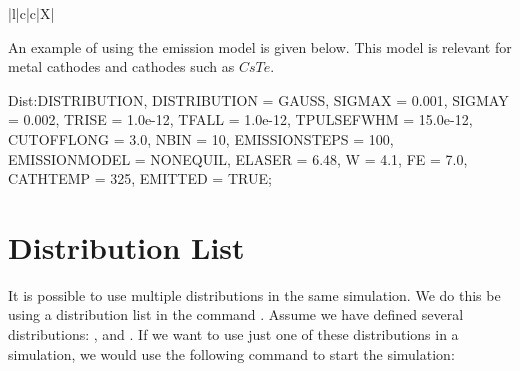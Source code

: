 \begin{table}[!htb]
  \begin{center}\footnotesize
    \caption{Attributes for the  and  emission models.}
    \label{tab:distattremitmodelnonequil}
    \begin{tabularx}{\textwidth-1cm}{|l|c|c|X|}
      \hline
      \hline
      \hline
    \end{tabularx}
  \end{center}
\end{table}

An example of using the  emission model is given below. This model is relevant for metal
cathodes and cathodes such as $CsTe$.

\begin{example}
Dist:DISTRIBUTION, DISTRIBUTION = GAUSS,
                   SIGMAX = 0.001,
                   SIGMAY = 0.002,
                   TRISE = 1.0e-12,
                   TFALL = 1.0e-12,
                   TPULSEFWHM = 15.0e-12,
                   CUTOFFLONG = 3.0,
                   NBIN = 10,
                   EMISSIONSTEPS = 100,
                   EMISSIONMODEL = NONEQUIL,
                   ELASER = 6.48,
                   W = 4.1,
                   FE = 7.0,
                   CATHTEMP = 325,
                   EMITTED = TRUE;
\end{example}



\section{Distribution List}
\label{sec:distlist}
\FloatBarrier

It is possible to use multiple distributions in the same simulation. We do this be using a distribution list
in the  command . Assume we have defined several distributions: ,
 and . If we want to use just one of these distributions in a simulation, we would use the
following  command to start the simulation:


